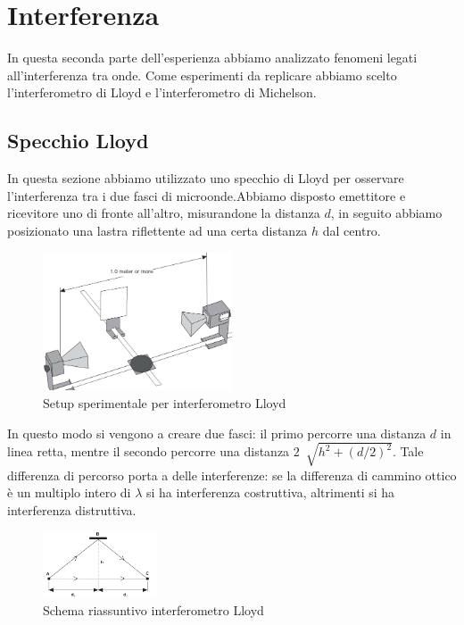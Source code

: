 \documentclass[letterpaper,12pt]{article}
\begin{document}
\newpage
\section{Interferenza}
In questa seconda parte dell'esperienza abbiamo analizzato fenomeni legati all'interferenza tra onde. Come esperimenti da replicare 
abbiamo scelto l'interferometro di Lloyd e l'interferometro di Michelson.\\

\subsection{Specchio Lloyd}
In questa sezione abbiamo utilizzato uno specchio di Lloyd per osservare l'interferenza tra i due fasci 
di microonde.Abbiamo disposto emettitore e ricevitore uno di fronte all'altro, misurandone la distanza $d$, 
in seguito abbiamo posizionato una lastra riflettente ad una certa distanza $h$ dal centro. \\
\begin{figure}[h!]
	\centering
	\includegraphics[width = 0.5\textwidth]{LloydSetup.png}
	\caption{Setup sperimentale per interferometro Lloyd}
	\label{fig:setupLloyd}
\end{figure}

In questo modo si vengono a creare due fasci: il primo percorre una distanza $d$ in linea retta, mentre il secondo
percorre una distanza $2\ \sqrt[]{h^2 + (d/2)^2}$. Tale differenza di percorso porta a delle interferenze:
se la differenza di cammino ottico è un multiplo intero di $\lambda$ si ha interferenza costruttiva,
altrimenti si ha interferenza distruttiva.\\
\begin{figure}[h!]
	\centering
	\includegraphics[width = 0.3\textwidth]{SchemaLloyd.png}
	\caption{Schema riassuntivo interferometro Lloyd}
	\label{fig:schemaLloyd}
\end{figure}
\end{document}
